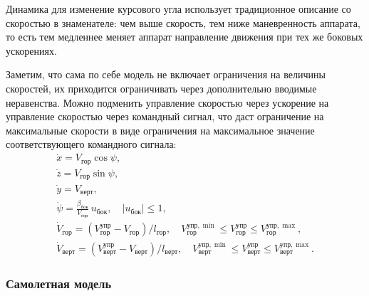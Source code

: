 \documentclass[a4paper,12pt]{article}
\numberwithin{figure}{subsubsection}
\begin{document}
Динамика для изменение курсового угла использует традиционное описание со скоростью в знаменателе: чем выше скорость, тем ниже маневренность аппарата, то есть тем медленнее меняет аппарат направление движения при тех же боковых ускорениях.

Заметим, что сама по себе модель не включает ограничения на величины скоростей, их приходится ограничивать через дополнительно вводимые неравенства. Можно подменить управление скоростью через ускорение на управление скоростью через командный сигнал, что даст ограничение на максимальные скорости в виде ограничения на максимальное значение соответствующего командного сигнала:
\begin{equation*}
  \begin{array}{l}
    \dot x = V_\text{гор} \cos \psi, \\[0.75ex]
    \dot z = V_\text{гор} \sin \psi, \\[0.75ex]
    \dot y = V_\text{верт}, \\[0.75ex]
    \dot \psi   = \frac{\beta_\text{бок}}{V_\text{гор}} \, u_\text{бок}, \quad |u_\text{бок}| \leqslant 1, \\[0.75ex]
    \dot V_\text{гор} = (V^\text{упр}_\text{гор} - V_\text{гор}) / l_\text{гор}, \quad  
      V^{\text{упр},\min}_\text{гор} \leqslant V^\text{упр}_\text{гор} \leqslant V^{\text{упр},\max}_\text{гор}, \\[0.75ex]
    \dot V_\text{верт} = (V^\text{упр}_\text{верт} - V_\text{верт}) / l_\text{верт}, \quad  
      V^{\text{упр},\min}_\text{верт} \leqslant V^\text{упр}_\text{верт} \leqslant V^{\text{упр},\max}_\text{верт}.
  \end{array}
\end{equation*}


\subsubsection{Самолетная модель}
\end{document}
